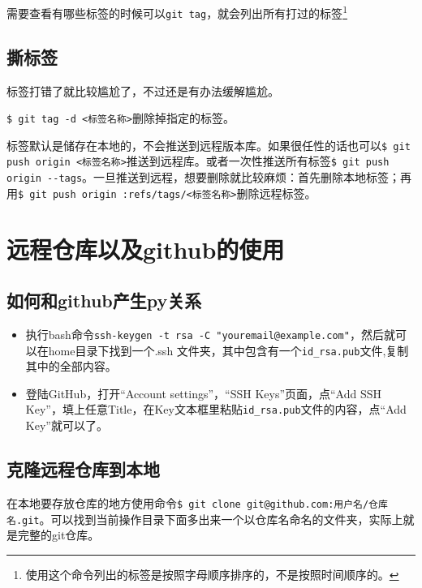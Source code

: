 \documentclass[UTF8]{ctexart}
\begin{document}
需要查看有哪些标签的时候可以\verb!git tag!，就会列出所有打过的标签\footnote{使用这个命令列出的标签是按照字母顺序排序的，不是按照时间顺序的。} 

\subsection{撕标签}
标签打错了就比较尴尬了，不过还是有办法缓解尴尬。

\verb!$ git tag -d <标签名称>!删除掉指定的标签。

标签默认是储存在本地的，不会推送到远程版本库。如果很任性的话也可以\verb!$ git push origin <标签名称>!推送到远程库。或者一次性推送所有标签\verb!$ git push origin --tags!。一旦推送到远程，想要删除就比较麻烦：首先删除本地标签；再用\verb!$ git push origin :refs/tags/<标签名称>!删除远程标签。


\section{远程仓库以及github的使用}
\subsection{如何和github产生py关系}
\begin{itemize}
\item 执行bash命令\verb!ssh-keygen -t rsa -C "youremail@example.com"!，然后就可以在home目录下找到一个.ssh 文件夹，其中包含有一个\verb!id_rsa.pub!文件,复制其中的全部内容。
\item 登陆GitHub，打开“Account settings”，“SSH Keys”页面，点“Add SSH Key”，填上任意Title，在Key文本框里粘贴\verb!id_rsa.pub!文件的内容，点“Add Key”就可以了。
\end{itemize}
\subsection{克隆远程仓库到本地}
在本地要存放仓库的地方使用命令\verb!$ git clone git@github.com:用户名/仓库名.git!。可以找到当前操作目录下面多出来一个以仓库名命名的文件夹，实际上就是完整的git仓库。
\end{document}
